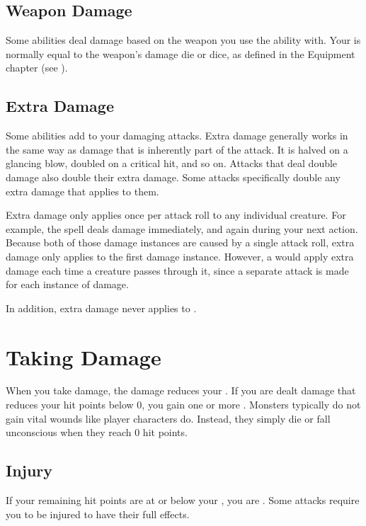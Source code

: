   \subsection{Weapon Damage}\label{Weapon Damage}
    Some abilities deal damage based on the weapon you use the ability with.
    Your  is normally equal to the weapon's damage die or dice, as defined in the Equipment chapter (see ).

  \subsection{Extra Damage}\label{Extra Damage}
    Some abilities add  to your damaging attacks.
    Extra damage generally works in the same way as damage that is inherently part of the attack.
    It is halved on a glancing blow, doubled on a critical hit, and so on.
    Attacks that deal double damage also double their extra damage.
    Some attacks specifically double any extra damage that applies to them.

    Extra damage only applies once per attack roll to any individual creature.
    For example, the  spell deals damage immediately, and again during your next action.
    Because both of those damage instances are caused by a single attack roll, extra damage only applies to the first damage instance.
    However, a  would apply extra damage each time a creature passes through it, since a separate attack is made for each instance of damage.

    In addition, extra damage never applies to .

\section{Taking Damage}\label{Taking Damage}
  When you take damage, the damage reduces your .
  If you are dealt damage that reduces your hit points below 0, you gain one or more .
  Monsters typically do not gain vital wounds like player characters do.
  Instead, they simply die or fall unconscious when they reach 0 hit points.

  \subsection{Injury}\label{Injury}
    If your remaining hit points are at or below your , you are .
    Some attacks require you to be injured to have their full effects.

